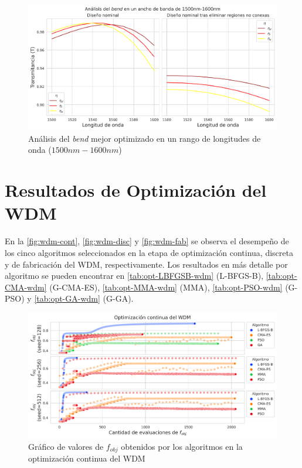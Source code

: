 \begin{figure}[ht]
  \centering
  \includegraphics[width=\textwidth]{image/results/bend/best/broadband-bend.png}
  \caption{Análisis del \emph{bend} mejor optimizado en un rango de longitudes de onda ($1500 nm-1600 nm$)}
  \label{fig:broadband-bend}
\end{figure}

\section{Resultados de Optimización del WDM}\label{sec:results-wdm}


En la \autoref{fig:wdm-cont}, \autoref{fig:wdm-disc} y \autoref{fig:wdm-fab} se observa 
el desempeño de los cinco algoritmos seleccionados en la etapa de optimización continua, discreta y
de fabricación del WDM, respectivamente.
Los resultados en más detalle por algoritmo se pueden encontrar en 
\autoref{tab:opt-LBFGSB-wdm} (L-BFGS-B),
\autoref{tab:opt-CMA-wdm} (G-CMA-ES),
\autoref{tab:opt-MMA-wdm} (MMA),
\autoref{tab:opt-PSO-wdm} (G-PSO) y
\autoref{tab:opt-GA-wdm} (G-GA).

\begin{landscape}
\begin{figure}[ht]
  \centering
  \includegraphics[scale=1.0]{image/results/wdm/wdm-opt-cont.png}
  \caption{Gráfico de valores de $f_{obj}$ obtenidos por los algoritmos en la optimización continua del WDM}
  \label{fig:wdm-cont}
\end{figure}
\end{landscape}

